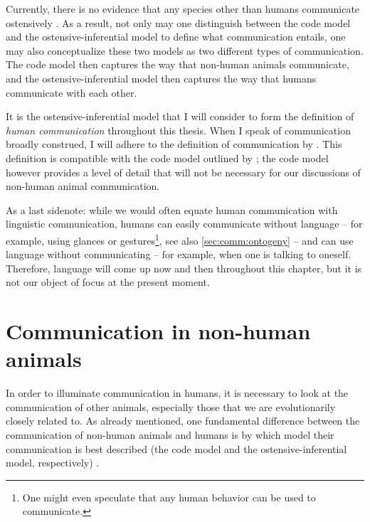 Currently, there is no evidence that any species other than humans communicate ostensively \citep{Scott-Phillips18-communication}. As a result, not only may one distinguish between the code model and the ostensive-inferential model to define what communication entails, one may also conceptualize these two models as two different types of communication. The code model then captures the way that non-human animals communicate, and the ostensive-inferential model then captures the way that humans communicate with each other.

It is the ostensive-inferential model that I will consider to form the definition of \emph{human communication} throughout this thesis. When I speak of communication broadly construed, I will adhere to the definition of communication by \citet{Freeberg19}. This definition is compatible with the code model outlined by \citet{Scott-Phillips18-communication}; the code model however provides a level of detail that will not be necessary for our discussions of non-human animal communication.

As a last sidenote: while we would often equate human communication with linguistic communication, humans can easily communicate without language -- for example, using glances or gestures\footnote{One might even speculate that any human behavior can be used to communicate.}, see also \cref{sec:comm:ontogeny} -- and can use language without communicating -- for example, when one is talking to oneself. Therefore, language will come up now and then throughout this chapter, but it is not our object of focus at the present moment.


\section{Communication in non-human animals}
\label{sec:comm:phylogeny}

In order to illuminate communication in humans, it is necessary to look at the communication of other animals, especially those that we are evolutionarily closely related to.
As already mentioned, one fundamental difference between the communication of non-human animals and humans is by which model their communication is best described (the code model and the ostensive-inferential model, respectively) \citep{Scott-Phillips15-primate, Scott-Phillips18-communication}.

